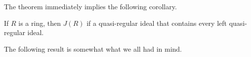 The theorem immediately implies the following corollary. 

\begin{corollary}
	If $R$ is a ring, then $J(R)$ if a quasi-regular ideal that contains every 
	left quasi-regular ideal. 
\end{corollary}

The following result is somewhat what we all had in mind. 


%
%	

%

